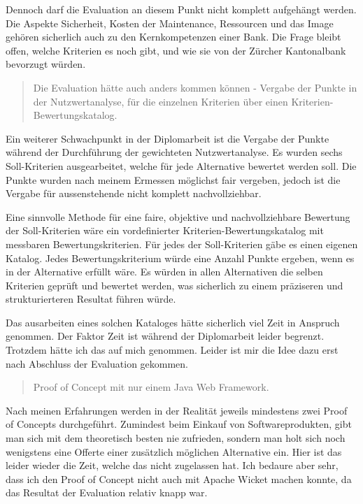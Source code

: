 Dennoch darf die Evaluation an diesem Punkt nicht komplett aufgehängt werden.
Die Aspekte Sicherheit, Kosten der Maintenance, Ressourcen und das Image gehören
sicherlich auch zu den Kernkompetenzen einer Bank. Die Frage bleibt offen,
welche Kriterien es noch gibt, und wie sie von der Zürcher Kantonalbank
bevorzugt würden.
\newline

\clearpage
  
\begin{quote}\begin{itshape}Die Evaluation hätte auch anders kommen können -
Vergabe der Punkte in der Nutzwertanalyse, für die einzelnen Kriterien über
einen Kriterien-Bewertungskatalog.\end{itshape}\end{quote}

Ein weiterer Schwachpunkt in der Diplomarbeit ist die Vergabe der Punkte während
der Durchführung der gewichteten Nutzwertanalyse. Es wurden sechs Soll-Kriterien
ausgearbeitet, welche für jede Alternative bewertet werden soll. Die Punkte
wurden nach meinem Ermessen möglichst fair vergeben, jedoch ist die Vergabe für
aussenstehende nicht komplett nachvollziehbar.

Eine sinnvolle Methode für eine faire, objektive und nachvollziehbare Bewertung
der Soll-Kriterien wäre ein vordefinierter Kriterien-Bewertungskatalog mit
messbaren Bewertungskriterien. Für jedes der Soll-Kriterien gäbe es einen
eigenen Katalog. Jedes Bewertungskriterium würde eine Anzahl Punkte ergeben,
wenn es in der Alternative erfüllt wäre. Es würden in allen Alternativen die
selben Kriterien geprüft und bewertet werden, was sicherlich zu einem
präziseren und strukturierteren Resultat führen würde.

Das ausarbeiten eines solchen Kataloges hätte sicherlich viel Zeit in Anspruch
genommen. Der Faktor Zeit ist während der Diplomarbeit leider begrenzt. Trotzdem
hätte ich das auf mich genommen. Leider ist mir die Idee dazu erst nach
Abschluss der Evaluation gekommen.
\newline
  
\begin{quote}\begin{itshape}Proof of Concept mit nur einem Java Web
Framework.\end{itshape}\end{quote}

Nach meinen Erfahrungen werden in der Realität jeweils mindestens zwei Proof of
Concepts durchgeführt. Zumindest beim Einkauf von Softwareprodukten, gibt man
sich mit dem theoretisch besten nie zufrieden, sondern man holt sich noch
wenigstens eine Offerte einer zusätzlich möglichen Alternative ein. Hier ist das
leider wieder die Zeit, welche das nicht zugelassen hat. Ich bedaure aber sehr,
dass ich den Proof of Concept nicht auch mit Apache Wicket machen konnte, da das
Resultat der Evaluation relativ knapp war.
\newline

